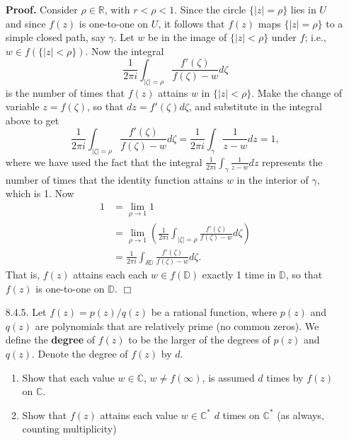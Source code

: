 \documentclass[9pt]{article}
\newcommand{\qed}{\hfill \ensuremath{\Box}}
\newcommand{\R}{\mathbb{R}}
\newcommand{\C}{\mathbb{C}}
\begin{document}
\begin{enumerate}
      \textbf{Proof.} Consider $\rho \in \R$, with $r < \rho < 1$. Since the
      circle $\{|z| = \rho\}$ lies in $U$ and since $f(z)$ is one-to-one on $U$,
      it follows that $f(z)$ maps $\{|z| = \rho\}$ to a simple closed path, say
      $\gamma$. Let $w$ be in the image of $\{|z| < \rho\}$ under $f$; i.e.,
      $w \in f(\{|z| < \rho\})$. Now the integral
      $$\frac{1}{2\pi i}\int_{|\zeta| = \rho}
        \frac{f'(\zeta)}{f(\zeta) - w}d\zeta$$
      is the number of times that $f(z)$ attains $w$ in $\{|z| < \rho\}$. Make
      the change of variable $z = f(\zeta)$, so that $dz = f'(\zeta)d\zeta$, and
      substitute in the integral above to get
      $$\frac{1}{2\pi i}\int_{|\zeta| = \rho}
        \frac{f'(\zeta)}{f(\zeta) - w}d\zeta = \frac{1}{2\pi i}\int_\gamma
        \frac{1}{z - w}dz = 1,$$
      where we have used the fact that the integral
      $\frac{1}{2\pi i}\int_\gamma\frac{1}{z - w}dz$ represents the number of
      times that the identity function attains $w$ in the interior of $\gamma$,
      which is 1. Now
      \begin{align*}
         1 &= \lim_{\rho \rightarrow 1}1 \\
         &= \lim_{\rho \rightarrow 1}\left(\frac{1}{2\pi i}\int_{|\zeta| = \rho}
        \frac{f'(\zeta)}{f(\zeta) - w}d\zeta\right) \\
         &= \frac{1}{2\pi i}\int_{\delta \mathbb{D}}
        \frac{f'(\zeta)}{f(\zeta) - w}d\zeta.
      \end{align*}
      That is, $f(z)$ attains each each $w \in f(\mathbb{D})$ exactly 1 time in
      $\mathbb{D}$, so that $f(z)$ is one-to-one on $\mathbb{D}$. \qed
   \item[8.4.5.]  Let $f(z) = p(z)/q(z)$ be a rational function, where $p(z)$
                  and $q(z)$ are polynomials that are relatively prime (no
                  common zeros). We define the \textbf{degree} of $f(z)$ to be
                  the larger of the degrees of $p(z)$ and $q(z)$. Denote the
                  degree of $f(z)$ by $d$.
                  \begin{enumerate}
                     \item Show that each value $w \in \C$, $w \neq f(\infty)$,
                           is assumed $d$ times by $f(z)$ on $\C$.
                     \item Show that $f(z)$ attains each value $w \in \C^*$ $d$
                           times on $\C^*$ (as always, counting multiplicity)
                  \end{enumerate}


\end{enumerate}
\end{document}
